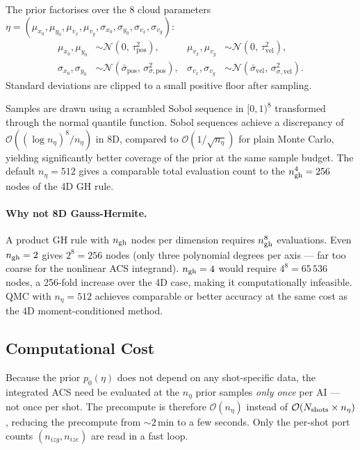 \documentclass[11pt,a4paper]{article}
\begin{document}
The prior factorises over the 8 cloud parameters
$\eta = (\mu_{x_0}, \mu_{y_0}, \mu_{v_x}, \mu_{v_y}, \sigma_{x_0},
\sigma_{y_0}, \sigma_{v_x}, \sigma_{v_y})$:
\begin{align}
  \mu_{x_0},\mu_{y_0} &\sim \mathcal{N}(0,\,\tau_\mathrm{pos}^2), &
  \mu_{v_x},\mu_{v_y} &\sim \mathcal{N}(0,\,\tau_\mathrm{vel}^2), \nonumber\\
  \sigma_{x_0},\sigma_{y_0} &\sim \mathcal{N}(\bar\sigma_\mathrm{pos},\,\sigma_{\sigma,\mathrm{pos}}^2), &
  \sigma_{v_x},\sigma_{v_y} &\sim \mathcal{N}(\bar\sigma_\mathrm{vel},\,\sigma_{\sigma,\mathrm{vel}}^2).
  \label{eq:prior8d}
\end{align}
Standard deviations are clipped to a small positive floor after sampling.

Samples are drawn using a scrambled Sobol sequence in $[0,1)^8$ transformed
through the normal quantile function.  Sobol sequences achieve a
discrepancy of $\mathcal{O}((\log n_\eta)^8 / n_\eta)$ in 8D, compared to
$\mathcal{O}(1/\sqrt{n_\eta})$ for plain Monte Carlo, yielding significantly
better coverage of the prior at the same sample budget.  The default
$n_\eta = 512$ gives a comparable total evaluation count to the $n_{\rm gh}^4
= 256$ nodes of the 4D GH rule.

\paragraph{Why not 8D Gauss-Hermite.}
A product GH rule with $n_{\rm gh}$ nodes per dimension requires
$n_{\rm gh}^8$ evaluations.  Even $n_{\rm gh}=2$ gives $2^8=256$ nodes
(only three polynomial degrees per axis — far too coarse for the nonlinear
ACS integrand).  $n_{\rm gh}=4$ would require $4^8=65\,536$ nodes, a 256-fold
increase over the 4D case, making it computationally infeasible.  QMC with
$n_\eta = 512$ achieves comparable or better accuracy at the same cost as the
4D moment-conditioned method.

\subsection{Computational Cost}

Because the prior $p_0(\eta)$ does not depend on any shot-specific data,
the integrated ACS need be evaluated at the $n_\eta$ prior samples
\emph{only once} per AI — not once per shot.  The precompute is therefore
$\mathcal{O}(n_\eta)$ instead of $\mathcal{O}(N_{\rm shots}\times n_\eta)$,
reducing the precompute from $\sim\!2$\,min to a few seconds.  Only the
per-shot port counts $(n_{izg}, n_{ize})$ are read in a fast loop.
\end{document}
